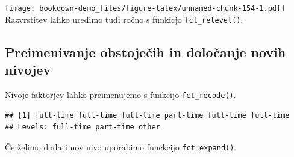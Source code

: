 \documentclass[
]{book}
\newenvironment{Shaded}{\begin{snugshade}}{\end{snugshade}}
\newcommand{\AttributeTok}[1]{\textcolor[rgb]{0.77,0.63,0.00}{#1}}
\newcommand{\FunctionTok}[1]{\textcolor[rgb]{0.00,0.00,0.00}{#1}}
\newcommand{\NormalTok}[1]{#1}
\newcommand{\OtherTok}[1]{\textcolor[rgb]{0.56,0.35,0.01}{#1}}
\newcommand{\SpecialCharTok}[1]{\textcolor[rgb]{0.00,0.00,0.00}{#1}}
\newcommand{\StringTok}[1]{\textcolor[rgb]{0.31,0.60,0.02}{#1}}
\begin{document}
\texttt{[image: bookdown-demo\_files/figure-latex/unnamed-chunk-154-1.pdf]}
Razvrstitev lahko uredimo tudi ročno s funkicjo \texttt{fct\_relevel()}.

\hypertarget{preimenivanje-obstojeux10dih-in-doloux10danje-novih-nivojev}{%
\subsection{Preimenivanje obstoječih in določanje novih nivojev}\label{preimenivanje-obstojeux10dih-in-doloux10danje-novih-nivojev}}

Nivoje faktorjev lahko preimenujemo s funkcijo \texttt{fct\_recode()}.

\begin{Shaded}
\end{Shaded}

\begin{verbatim}
## [1] full-time full-time full-time part-time full-time full-time
## Levels: full-time part-time other
\end{verbatim}

Če želimo dodati nov nivo uporabimo funckcijo \texttt{fct\_expand()}.

\begin{Shaded}
\end{Shaded}
\end{document}
